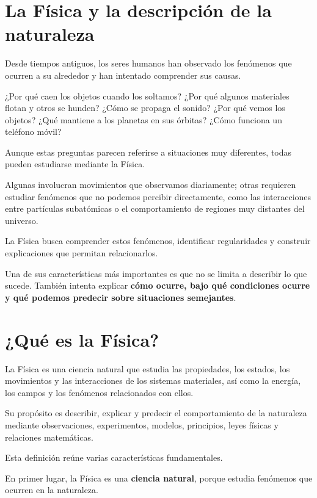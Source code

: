 ﻿\section{La Física y la descripción de la naturaleza}

Desde tiempos antiguos, los seres humanos han observado los fenómenos
que ocurren a su alrededor y han intentado comprender sus causas.

¿Por qué caen los objetos cuando los soltamos? ¿Por qué algunos
materiales flotan y otros se hunden? ¿Cómo se propaga el sonido?
¿Por qué vemos los objetos? ¿Qué mantiene a los planetas en sus
órbitas? ¿Cómo funciona un teléfono móvil?

Aunque estas preguntas parecen referirse a situaciones muy
diferentes, todas pueden estudiarse mediante la Física.

Algunas involucran movimientos que observamos diariamente;
otras requieren estudiar fenómenos que no podemos percibir
directamente, como las interacciones entre partículas
subatómicas o el comportamiento de regiones muy distantes
del universo.

La Física busca comprender estos fenómenos, identificar
regularidades y construir explicaciones que permitan relacionarlos.

Una de sus características más importantes es que no se limita
a describir lo que sucede. También intenta explicar
\textbf{cómo ocurre, bajo qué condiciones ocurre y qué podemos
predecir sobre situaciones semejantes}.


\section{¿Qué es la Física?}

\begin{definicion}[Física]

La Física es una ciencia natural que estudia las propiedades,
los estados, los movimientos y las interacciones de los sistemas
materiales, así como la energía, los campos y los fenómenos
relacionados con ellos.

Su propósito es describir, explicar y predecir el comportamiento
de la naturaleza mediante observaciones, experimentos, modelos,
principios, leyes físicas y relaciones matemáticas.

\end{definicion}

Esta definición reúne varias características fundamentales.

En primer lugar, la Física es una \textbf{ciencia natural},
porque estudia fenómenos que ocurren en la naturaleza.

